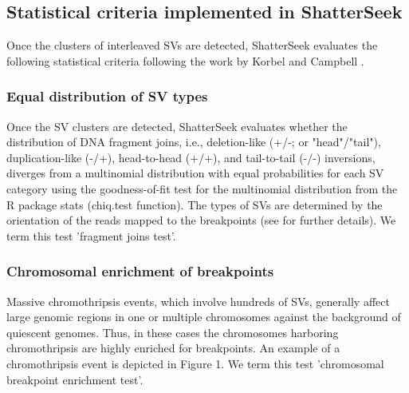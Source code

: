 \documentclass[twoside,a4wide,11pt]{article}\usepackage[]{graphicx}\usepackage[]{color}
\begin{document}
\subsection{Statistical criteria implemented in ShatterSeek}

Once the clusters of interleaved SVs are detected, ShatterSeek evaluates the following statistical criteria following the work by Korbel and Campbell \cite{Korbel2013}.


\subsubsection{Equal distribution of SV types}

Once the SV clusters are detected, ShatterSeek evaluates whether the distribution of DNA fragment joins,
i.e., deletion-like (+/-; or "head"/"tail"), duplication-like (-/+), head-to-head (+/+), and tail-to-tail (-/-) inversions,
diverges from a multinomial distribution with equal probabilities for each SV category using the goodness-of-fit test for the multinomial distribution from the R package stats (chiq.test function).
The types of SVs are determined by the orientation of the reads mapped to the breakpoints (see \cite{Zhang2013} for further details).
We term this test 'fragment joins test'.

\subsubsection{Chromosomal enrichment of breakpoints}
Massive chromothripsis events, which involve hundreds of SVs,
generally affect large genomic regions in one or multiple chromosomes against the background of 
quiescent genomes.
Thus, in these cases the chromosomes harboring chromothripsis are highly enriched for breakpoints.
An example of a chromothripsis event is depicted in Figure 1.
We term this test 'chromosomal breakpoint enrichment test'.
\end{document}
